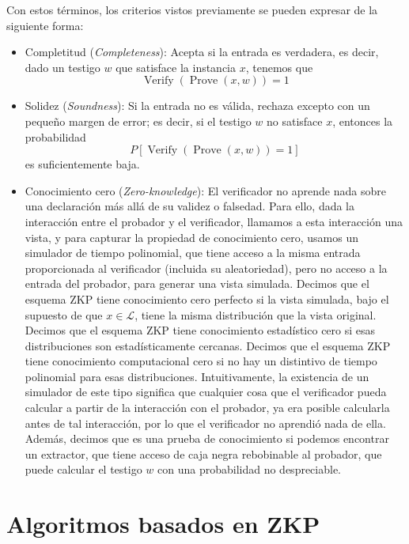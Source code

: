 Con estos términos, los criterios vistos previamente se pueden expresar de la siguiente forma:
\begin{itemize}
    \item Completitud (\emph{Completeness}): Acepta si la entrada es verdadera, es decir, dado un testigo $w$ que satisface la instancia $x$, tenemos que
    $$\operatorname{Verify}(\operatorname{Prove}(x, w)) = 1$$

    \item Solidez (\emph{Soundness}): Si la entrada no es válida, rechaza excepto con un pequeño margen de error; es decir, si el testigo $w$ no satisface $x$, entonces la probabilidad
    $$P[\operatorname{Verify}(\operatorname{Prove}(x, w)) = 1]$$
    es suficientemente baja.

    \item Conocimiento cero (\emph{Zero-knowledge}): El verificador no aprende nada sobre una declaración más allá de su validez o falsedad. Para ello, dada la interacción entre el probador y el verificador, llamamos a esta interacción una vista, y para capturar la propiedad de conocimiento cero, usamos un simulador de tiempo polinomial, que tiene acceso a la misma entrada proporcionada al verificador (incluida su aleatoriedad), pero no acceso a la entrada del probador, para generar una vista simulada. Decimos que el esquema ZKP tiene conocimiento cero perfecto si la vista simulada, bajo el supuesto de que $x \in \mathcal{L}$, tiene la misma distribución que la vista original. Decimos que el esquema ZKP tiene conocimiento estadístico cero si esas distribuciones son estadísticamente cercanas. Decimos que el esquema ZKP tiene conocimiento computacional cero si no hay un distintivo de tiempo polinomial para esas distribuciones. Intuitivamente, la existencia de un simulador de este tipo significa que cualquier cosa que el verificador pueda calcular a partir de la interacción con el probador, ya era posible calcularla antes de tal interacción, por lo que el verificador no aprendió nada de ella. Además, decimos que es una prueba de conocimiento si podemos encontrar un extractor, que tiene acceso de caja negra rebobinable al probador, que puede calcular el testigo $w$ con una probabilidad no despreciable.
\end{itemize}

\section{Algoritmos basados en ZKP}


